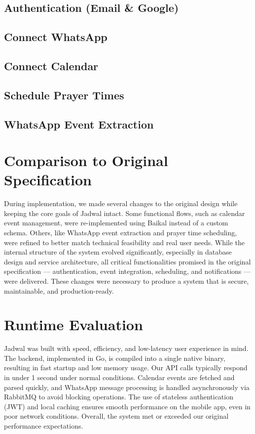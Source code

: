 \subsection{Authentication (Email \& Google)}
\subsection{Connect WhatsApp}
\subsection{Connect Calendar}
\subsection{Schedule Prayer Times}
\subsection{WhatsApp Event Extraction}

\section{Comparison to Original Specification}

During implementation, we made several changes to the original design while keeping the core goals of Jadwal intact. Some functional flows, such as calendar event management, were re-implemented using Baikal instead of a custom schema. Others, like WhatsApp event extraction and prayer time scheduling, were refined to better match technical feasibility and real user needs. While the internal structure of the system evolved significantly, especially in database design and service architecture, all critical functionalities promised in the original specification — authentication, event integration, scheduling, and notifications — were delivered. These changes were necessary to produce a system that is secure, maintainable, and production-ready.

\section{Runtime Evaluation}

Jadwal was built with speed, efficiency, and low-latency user experience in mind. The backend, implemented in Go, is compiled into a single native binary, resulting in fast startup and low memory usage. Our API calls typically respond in under 1 second under normal conditions. Calendar events are fetched and parsed quickly, and WhatsApp message processing is handled asynchronously via RabbitMQ to avoid blocking operations. The use of stateless authentication (JWT) and local caching ensures smooth performance on the mobile app, even in poor network conditions. Overall, the system met or exceeded our original performance expectations.
